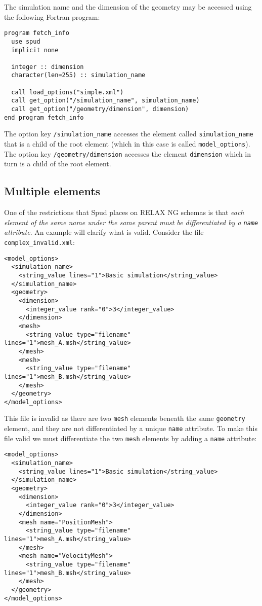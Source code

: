 \documentclass[a4paper, 11pt]{book}
\begin{document}
The simulation name and the dimension of the geometry may be accessed
using the following Fortran program:
\begin{verbatim}
program fetch_info
  use spud
  implicit none

  integer :: dimension
  character(len=255) :: simulation_name

  call load_options("simple.xml")
  call get_option("/simulation_name", simulation_name)
  call get_option("/geometry/dimension", dimension)
end program fetch_info
\end{verbatim}

The option key \verb+/simulation_name+ accesses the element
called \verb+simulation_name+ that is a child of the root element
(which in this case is called \verb+model_options+). The option key
\verb+/geometry/dimension+ accesses the element \verb+dimension+ which
in turn is a child of the root element.

\subsection{Multiple elements}
One of the restrictions that Spud places on RELAX NG schemas
is that \emph{each element of the same name under the same parent
must be differentiated by a \texttt{name} attribute}. An example will
clarify what is valid. Consider the file \verb+complex_invalid.xml+:
\begin{verbatim}
<model_options>
  <simulation_name>
    <string_value lines="1">Basic simulation</string_value>
  </simulation_name>
  <geometry>
    <dimension>
      <integer_value rank="0">3</integer_value>
    </dimension>
    <mesh>
      <string_value type="filename" lines="1">mesh_A.msh</string_value>
    </mesh>
    <mesh>
      <string_value type="filename" lines="1">mesh_B.msh</string_value>
    </mesh>
  </geometry>
</model_options>
\end{verbatim}

This file is invalid as there are two \verb+mesh+ elements beneath the same
\verb+geometry+ element, and they are not differentiated by a unique \verb+name+
attribute. To make this file valid we must differentiate the two \verb+mesh+
elements by adding a \verb+name+ attribute:

\begin{verbatim}
<model_options>
  <simulation_name>
    <string_value lines="1">Basic simulation</string_value>
  </simulation_name>
  <geometry>
    <dimension>
      <integer_value rank="0">3</integer_value>
    </dimension>
    <mesh name="PositionMesh">
      <string_value type="filename" lines="1">mesh_A.msh</string_value>
    </mesh>
    <mesh name="VelocityMesh">
      <string_value type="filename" lines="1">mesh_B.msh</string_value>
    </mesh>
  </geometry>
</model_options>
\end{verbatim}
\end{document}
